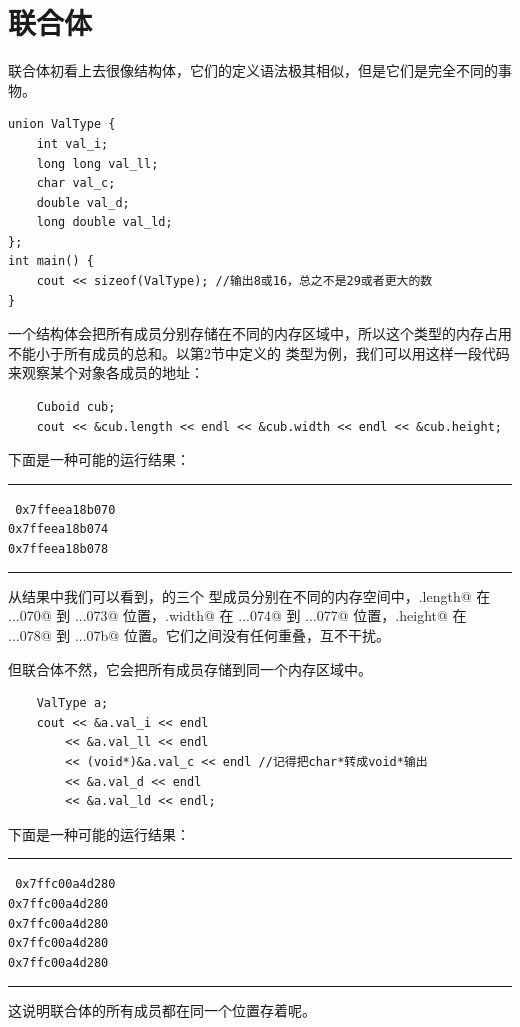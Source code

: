 \section{联合体}
联合体初看上去很像结构体，它们的定义语法极其相似，但是它们是完全不同的事物。
\begin{lstlisting}
union ValType {
    int val_i;
    long long val_ll;
    char val_c;
    double val_d;
    long double val_ld;
};
int main() {
    cout << sizeof(ValType); //输出8或16，总之不是29或者更大的数
}
\end{lstlisting}
一个结构体会把所有成员分别存储在不同的内存区域中，所以这个类型的内存占用不能小于所有成员的总和。以第2节中定义的 \lstinline@Cuboid@ 类型为例，我们可以用这样一段代码来观察某个对象各成员的地址：
\begin{lstlisting}
    Cuboid cub;
    cout << &cub.length << endl << &cub.width << endl << &cub.height;
\end{lstlisting}
下面是一种可能的运行结果：\\\noindent\rule{\linewidth}{.2pt}\texttt{
0x7ffeea18b070\\
0x7ffeea18b074\\
0x7ffeea18b078
}\\\noindent\rule{\linewidth}{.2pt}\par
从结果中我们可以看到，\lstinline@cub@ 的三个 \lstinline@int@ 型成员分别在不同的内存空间中，\lstinline@cub.length@ 在 \lstinline@...070@ 到 \lstinline@...073@ 位置，\lstinline@cub.width@ 在 \lstinline@...074@ 到 \lstinline@...077@ 位置，\lstinline@cub.height@ 在 \lstinline@...078@ 到 \lstinline@...07b@ 位置。它们之间没有任何重叠，互不干扰。\par
但联合体不然，它会把所有成员存储到同一个内存区域中。
\begin{lstlisting}
    ValType a;
    cout << &a.val_i << endl
        << &a.val_ll << endl
        << (void*)&a.val_c << endl //记得把char*转成void*输出
        << &a.val_d << endl
        << &a.val_ld << endl;
\end{lstlisting}
下面是一种可能的运行结果：\\\noindent\rule{\linewidth}{.2pt}\texttt{
0x7ffc00a4d280\\
0x7ffc00a4d280\\
0x7ffc00a4d280\\
0x7ffc00a4d280\\
0x7ffc00a4d280
}\\\noindent\rule{\linewidth}{.2pt}
这说明联合体的所有成员都在同一个位置存着呢。\par

